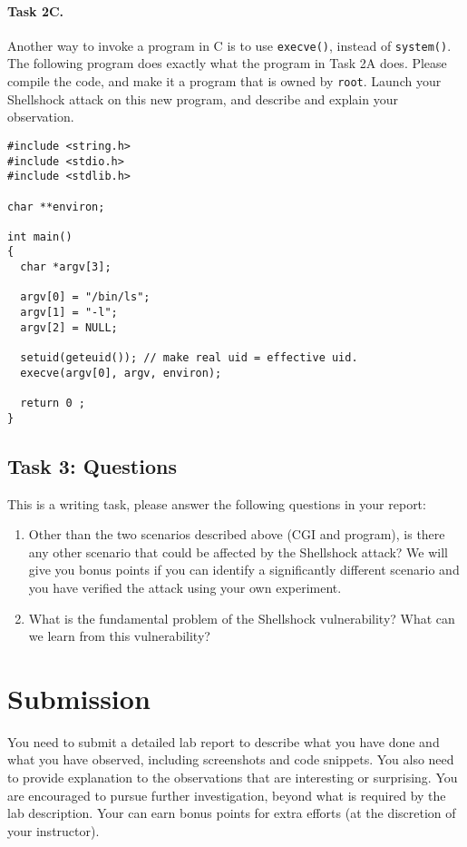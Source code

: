 \paragraph{Task 2C.}

Another way to invoke a program in C is to use {\tt execve()}, instead of
{\tt system()}. The following program does exactly what the program in
Task 2A does. Please compile the code, and make it a \setuid program that
is owned by {\tt root}. Launch your Shellshock attack on this new program,
and describe and explain your observation. 

\begin{Verbatim}[frame=single] 
#include <string.h>
#include <stdio.h>
#include <stdlib.h>

char **environ;

int main()
{
  char *argv[3];

  argv[0] = "/bin/ls"; 
  argv[1] = "-l"; 
  argv[2] = NULL;

  setuid(geteuid()); // make real uid = effective uid.
  execve(argv[0], argv, environ);

  return 0 ;
}
\end{Verbatim}



\subsection{Task 3: Questions}


This is a writing task, please answer the following questions in your
report:
\begin{enumerate}
\item Other than the two scenarios described above (CGI and \setuid
program), is there any other scenario that could be affected by the
Shellshock attack? We will give you bonus points if you can identify a
significantly different scenario and you have verified the attack using your
own experiment.


\item What is the fundamental problem of the Shellshock vulnerability?  
What can we learn from this vulnerability? 
\end{enumerate}



\section{Submission}

You need to submit a detailed lab report to describe what you have done and
what you have observed, including screenshots and code snippets.
You also need to provide explanation to the
observations that are interesting or surprising. You are encouraged to
pursue further investigation, beyond what is required by the lab
description. Your can earn bonus points for extra efforts (at the
discretion of your instructor).



